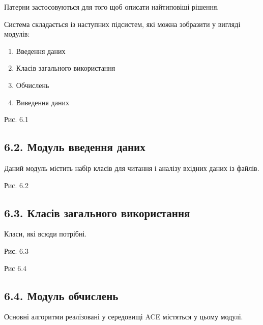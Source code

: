 Патерни застосовуються для того щоб описати найтиповіші рішення.

Система складається із наступних підсистем, які можна зобразити у
вигляді модулів:

\begin{enumerate}
\def\labelenumi{\arabic{enumi}.}
\item
  Введення даних
\item
  Класів загального використання
\item
  Обчислень
\item
  Виведення даних
\end{enumerate}

Рис. 6.1

\hypertarget{ux43cux43eux434ux443ux43bux44c-ux432ux432ux435ux434ux435ux43dux43dux44f-ux434ux430ux43dux438ux445}{%
\subsection{6.2. Модуль введення
даних}\label{ux43cux43eux434ux443ux43bux44c-ux432ux432ux435ux434ux435ux43dux43dux44f-ux434ux430ux43dux438ux445}}

Даний модуль містить набір класів для читання і аналізу вхідних даних із
файлів.

Рис. 6.2

\hypertarget{ux43aux43bux430ux441ux456ux432-ux437ux430ux433ux430ux43bux44cux43dux43eux433ux43e-ux432ux438ux43aux43eux440ux438ux441ux442ux430ux43dux43dux44f}{%
\subsection{6.3. Класів загального
використання}\label{ux43aux43bux430ux441ux456ux432-ux437ux430ux433ux430ux43bux44cux43dux43eux433ux43e-ux432ux438ux43aux43eux440ux438ux441ux442ux430ux43dux43dux44f}}

Класи, які всюди потрібні.

Рис. 6.3

Рис 6.4

\hypertarget{ux43cux43eux434ux443ux43bux44c-ux43eux431ux447ux438ux441ux43bux435ux43dux44c}{%
\subsection{6.4. Модуль
обчислень}\label{ux43cux43eux434ux443ux43bux44c-ux43eux431ux447ux438ux441ux43bux435ux43dux44c}}

Основні алгоритми реалізовані у середовищі ACE містяться у цьому модулі.

